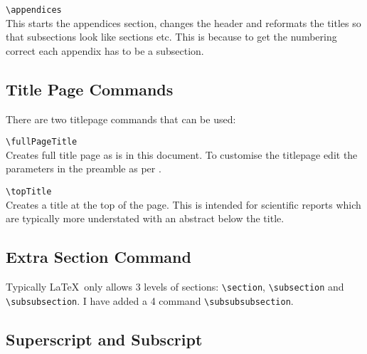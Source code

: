 \documentclass[Book Template.tex]{subfiles}
\begin{document}
                \verb+\appendices+\\
                This starts the appendices section, changes the header and reformats the titles so that subsections look like sections etc. This is because to get the numbering correct each appendix has to be a subsection.


            \subsection{Title Page Commands}
                \label{subsec: title page commands}

                There are two titlepage commands that can be used:

                \verb+\fullPageTitle+\\
                Creates full title page as is in this document. To customise the titlepage edit the parameters in the preamble as per .

                \verb+\topTitle+\\
                Creates a title at the top of the page. This is intended for scientific reports which are typically more understated with an abstract below the title.


            \subsection{Extra Section Command}
                \label{subsec: extra section command}

                Typically \LaTeX~only allows 3 levels of sections: \verb+\section+, \verb+\subsection+ and \verb+\subsubsection+. I have added a 4 command \verb+\subsubsubsection+.


            \subsection{Superscript and Subscript}
                \label{subsec: superscript and subscript}
\end{document}
